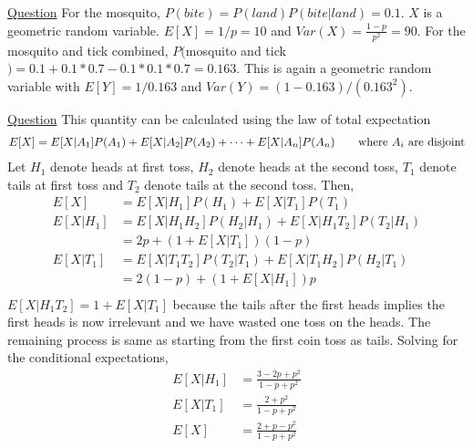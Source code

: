 \documentclass[11pt, a4paper]{article}
\begin{document}
\begin{enumerate}
        
        \hypertarget{a_mosquito}{\item} \hyperlink{q_mosquito}{Question}\newline
        For the mosquito, $P(bite) =  P(land)P(bite|land) = 0.1$. $X$ is a geometric random variable. $E[X] = 1/p = 10$ and $Var(X) = \frac{1-p}{p^{2}} = 90$.\newline
        For the mosquito and tick combined, $P($mosquito and tick$) = 0.1 + 0.1*0.7 - 0.1*0.1*0.7 = 0.163$. This is again a geometric random variable with $E[Y] = 1/0.163$ and $Var(Y) = (1-0.163)/(0.163^{2})$.


        \hypertarget{a_hhtt}{\item} \hyperlink{q_hhtt}{Question}\newline
        This quantity can be calculated using the law of total expectation
        \begin{align*}
            E[X] = E[X|A_{1}]P(A_{1}) + E[X|A_{2}]P(A_{2}) + \cdots + E[X|A_{n}]P(A_{n}) \tag*{where $A_{i}$ are disjoint}
        \end{align*}
        Let $H_{1}$ denote heads at first toss, $H_{2}$ denote heads at the second toss, $T_{1}$ denote tails at first toss and $T_{2}$ denote tails at the second toss. Then,
        \begin{align*}
            E[X] &= E[X|H_{1}]P(H_{1}) + E[X|T_{1}]P(T_{1})\\
            E[X|H_{1}] &= E[X|H_{1}H_{2}]P(H_{2}|H_{1}) + E[X|H_{1}T_{2}]P(T_{2}|H_{1})\\
                    &= 2p + (1 + E[X|T_{1}])(1-p)\\
            E[X|T_{1}] &= E[X|T_{1}T_{2}]P(T_{2}|T_{1}) + E[X|T_{1}H_{2}]P(H_{2}|T_{1})\\
                    &= 2(1-p) + (1 + E[X|H_{1}])p\\
        \end{align*}
        $E[X|H_{1}T_{2}] = 1 + E[X|T_{1}]$ because the tails after the first heads implies the first heads is now irrelevant and we have wasted one toss on the heads. The remaining process is same as starting from the first coin toss as tails. \newline
        Solving for the conditional expectations,
        \begin{align*}
            E[X|H_{1}] &= \frac{3 - 2p + p^{2}}{1 - p + p^{2}}\\
            E[X|T_{1}] &= \frac{2 + p^{2}}{1 - p + p^{2}}\\
            E[X] &= \frac{2 + p - p^{2}}{1 - p + p^{2}}
        \end{align*}


\end{enumerate}
\end{document}
